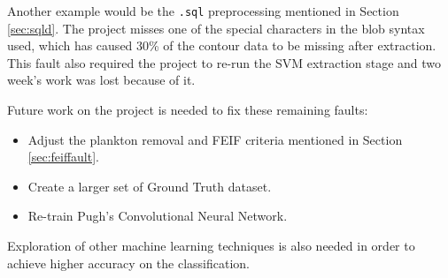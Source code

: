 \documentclass[bsc,frontabs,twoside,fullspacing,parskip,deptreport]{infthesis}
\begin{document}
Another example would be the {\tt .sql} preprocessing mentioned in Section \ref{sec:sqld}.
The project misses one of the special characters in the blob syntax used, which has caused 30\% of the contour data to be missing after extraction.
This fault also required the project to re-run the SVM extraction stage and two week's work was lost because of it.

Future work on the project is needed to fix these remaining faults:
\begin{itemize}
\setlength{\parskip}{0pt}
\item Adjust the plankton removal and FEIF criteria mentioned in Section \ref{sec:feiffault}.
\item Create a larger set of Ground Truth dataset.
\item Re-train Pugh's Convolutional Neural Network.
\end{itemize}
 
Exploration of other machine learning techniques is also needed in order to achieve higher accuracy on the classification. 

\let\OLDthebibliography\thebibliography
\renewcommand\thebibliography[1]{
  \OLDthebibliography{#1}
  \setlength{\parskip}{0pt}
  \setlength{\itemsep}{5pt plus 0.3ex}
}



\end{document}
